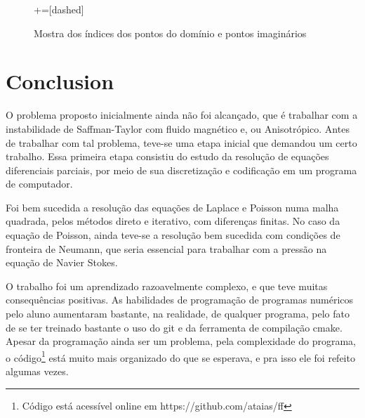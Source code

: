 \documentclass[journal]{IEEEtran}
\begin{document}
\begin{figure}
\centering
{}+=[dashed]%
\caption{Mostra dos índices dos pontos do domínio e pontos imaginários\label{uma_malha}}
\end{figure}
\section{Conclusion}

O problema proposto inicialmente ainda não foi alcançado, que é trabalhar com a instabilidade de Saffman-Taylor com fluido magnético e, ou Anisotrópico. Antes de trabalhar com tal problema, teve-se uma etapa inicial que demandou um certo trabalho. Essa primeira etapa consistiu do estudo da resolução de equações diferenciais parciais, por meio de sua discretização e codificação em um programa de computador.

Foi bem sucedida a resolução das equações de Laplace e Poisson numa malha quadrada, pelos métodos direto e iterativo, com diferenças finitas. No caso da equação de Poisson, ainda teve-se a resolução bem sucedida com condições de fronteira de Neumann, que seria essencial para trabalhar com a pressão na equação de Navier Stokes.

O trabalho foi um aprendizado razoavelmente complexo, e que teve muitas consequências positivas. As habilidades de programação de programas numéricos pelo aluno aumentaram bastante, na realidade, de qualquer programa, pelo fato de se ter treinado bastante o uso do git e da ferramenta de compilação cmake. Apesar da programação ainda ser um problema, pela complexidade do programa, o código\footnote{Código está acessível online em https://github.com/ataias/ff} está muito mais organizado do que se esperava, e pra isso ele foi refeito algumas vezes.
\end{document}

